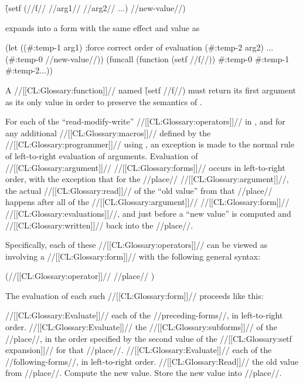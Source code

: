 \f{(setf (//f// //arg1// //arg2// ...) //new-value//)}

expands into a form with the same effect and value as

\code
 (let ((#:temp-1 arg1)          ;force correct order of evaluation
       (#:temp-2 arg2)
       ...
       (#:temp-0 //new-value//))
   (funcall (function (setf //f//)) #:temp-0 #:temp-1 #:temp-2...))
\endcode

A //[[CL:Glossary:function]]// named \f{(setf //f//)} must return its first argument
as its only value in order to preserve the semantics of .



\endsubsubsection%




\endsubSection%



For each of the ``read-modify-write'' //[[CL:Glossary:operators]]// in \thenextfigure, 
and for any additional //[[CL:Glossary:macros]]// 
defined by the //[[CL:Glossary:programmer]]// using ,
an exception is made to the normal rule of left-to-right evaluation of arguments.
Evaluation of //[[CL:Glossary:argument]]// //[[CL:Glossary:forms]]// occurs in left-to-right order,
with the exception that for the //place// //[[CL:Glossary:argument]]//, the actual
//[[CL:Glossary:read]]// of the ``old value'' from that //place// happens 
after all of the //[[CL:Glossary:argument]]// //[[CL:Glossary:form]]// //[[CL:Glossary:evaluations]]//, 
and just before a ``new value'' is computed and //[[CL:Glossary:written]]// back into the //place//.

Specifically, each of these //[[CL:Glossary:operators]]// can be viewed as involving a
//[[CL:Glossary:form]]// with the following general syntax:

\code
 (//[[CL:Glossary:operator]]//  //place// )
\endcode

The evaluation of each such //[[CL:Glossary:form]]// proceeds like this:

\beginlist
{} //[[CL:Glossary:Evaluate]]// each of the //preceding-forms//, in left-to-right order.
 //[[CL:Glossary:Evaluate]]// the //[[CL:Glossary:subforms]]// of the //place//,
 in the order specified by the second value of the //[[CL:Glossary:setf expansion]]//
 for that //place//.
 //[[CL:Glossary:Evaluate]]// each of the //following-forms//, in left-to-right order.
 //[[CL:Glossary:Read]]// the old value from //place//.
 Compute the new value.
 Store the new value into //place//.
\endlist




\endsubSection%
